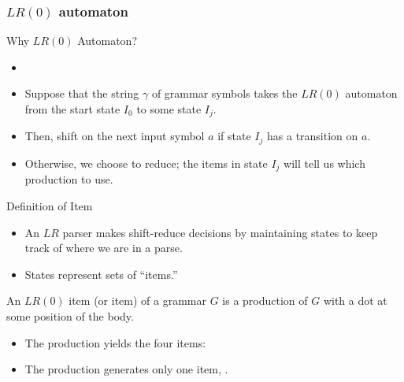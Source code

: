 \begin{bibunit}[apalike]
\subsubsection{$LR(0)$ automaton}

\tableofcontentslide[sectionstyle={show/shaded},subsectionstyle={show/shaded/hide},subsubsectionstyle={show/shaded/hide/hide}]

\begin{frame}{Why $LR(0)$ Automaton?}
	\begin{itemize}
	\item {}
	\vfill
	\item Suppose that the string $\gamma$ of grammar symbols takes the $LR(0)$ automaton from the start state $I_0$ to some state $I_j$.
	\vfill
	\item Then, shift on the next input symbol $a$ if state $I_j$ has a transition on $a$.
	\vfill
	\item Otherwise, we choose to reduce; the items in state $I_j$ will tell us which production to use.
	\end{itemize}
\end{frame}

\begin{frame}{Definition of Item}
	\begin{itemize}
	\item An $LR$ parser makes shift-reduce decisions by maintaining states to keep track of where we are in a parse.
	\item States represent sets of ``items.''
	\end{itemize}
	\begin{definition}[Item]
		An $LR(0)$ item (or item) of a grammar $G$ is a production of $G$ with a dot at some position of the body.
	\end{definition}
	\begin{itemize}
	\item The production  yields the four items:
		\begin{center}\footnotesize\begin{bnf}[.4\linewidth]
		\end{bnf}\end{center}
	\item The production  generates only one item, .
	\end{itemize}
\end{frame}


\end{bibunit}
